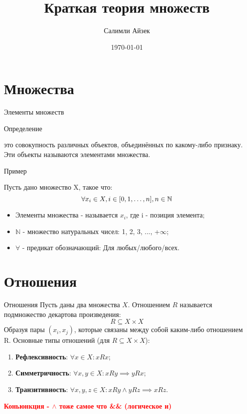 \documentclass{beamer}
\title[МОП]{Краткая теория множеств}
\author{Салимли Айзек}
\institute{MathLang}
\date{\today}
\newenvironment{rusdefinition}[1][Определение]{
    \begin{block}{#1}
}{\end{block}}
\newenvironment{rexample}[1][Пример]{\begin{exampleblock}{#1}}{\end{exampleblock}}
\begin{document}
\begin{frame}
    \titlepage
\end{frame}


\section{Множества}

\begin{frame}{Элементы множеств}
    \begin{rusdefinition}
        это совокупность различных объектов, объединённых по какому-либо признаку.
        Эти объекты называются элементами множества.
    \end{rusdefinition}
    \begin{rexample}

    Пусть дано множество X, такое что:
    \[
        \forall x_i \in X, \space i \in [0, 1, \dots, n], n \in \mathbb{N}
    \]
\end{rexample}
    \begin{itemize}
        \item Элементы множества - называется $x_i$, где i - позиция элемента;
        \item $\mathbb{N}$ - множество натуральных чисел: 1, 2, 3, ..., +$\infty$;
        \item $\forall$ - предикат обозначающий: Для любых/любого/всех. 
    \end{itemize}
\end{frame}

\section{Отношения}

\begin{frame}{Отношения}
    Пусть даны два множества $X$. Отношением $R$ называется подмножество декартова произведения:
    \[
        R \subseteq X \times X
    \]
    Образуя пары $(x_i, x_j)$, которые связаны между собой каким-либо отношением R.
    Основные типы отношений (для $R \subseteq X \times X $):
    \begin{enumerate}
        \item \textbf{Рефлексивность}: $\forall x \in X \colon x R x$;
        \item \textbf{Симметричность}: $\forall x, y \in X \colon x R y \implies y R x$;
        \item \textbf{Транзитивность}: $\forall x, y, z \in X \colon x R y \land y R z \implies x R z$.
    \end{enumerate}
    \textbf{\textcolor{red}{Коньюнкция - $\land$ тоже самое что \&\& (логическое и)}}
\end{frame}
\end{document}
